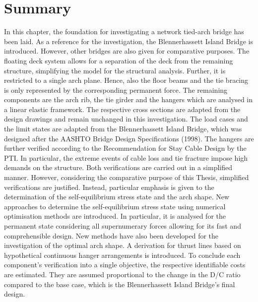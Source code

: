 \newpage
\section{Summary}
In this chapter, the foundation for investigating a network tied-arch bridge has been laid. As a reference for the investigation, the Blennerhassett Island Bridge is introduced. However, other bridges are also given for comparative purposes. The floating deck system allows for a separation of the deck from the remaining structure, simplifying the model for the structural analysis. Further, it is restricted to a single arch plane. Hence, also the floor beams and the tie bracing is only represented by the corresponding permanent force. The remaining components are the arch rib, the tie girder and the hangers which are analysed in a linear elastic framework. The respective cross sections are adapted from the design drawings and remain unchanged in this investigation. The load cases and the limit states are adapted from the Blennerhassett Island Bridge, which was designed after the AASHTO Bridge Design Specifications (1998). The hangers are further verified according to the Recommendation for Stay Cable Design by the PTI. In particular, the extreme events of cable loss and tie fracture impose high demands on the structure. Both verifications are carried out in a simplified manner. However, considering the comparative purpose of this Thesis, simplified verifications are justified. Instead, particular emphasis is given to the determination of the self-equilibrium stress state and the arch shape. New approaches to determine the self-equilibrium stress state using numerical optimisation methods are introduced. In particular, it is analysed for the permanent state considering all supernumerary forces allowing for its fast and comprehensible design. New methods have also been developed for the investigation of the optimal arch shape. A derivation for thrust lines based on hypothetical continuous hanger arrangements is introduced. To conclude each component's verification into a single objective, the respective identifiable costs are estimated. They are assumed proportional to the change in the D/C ratio compared to the base case, which is the Blennerhassett Island Bridge's final design.
